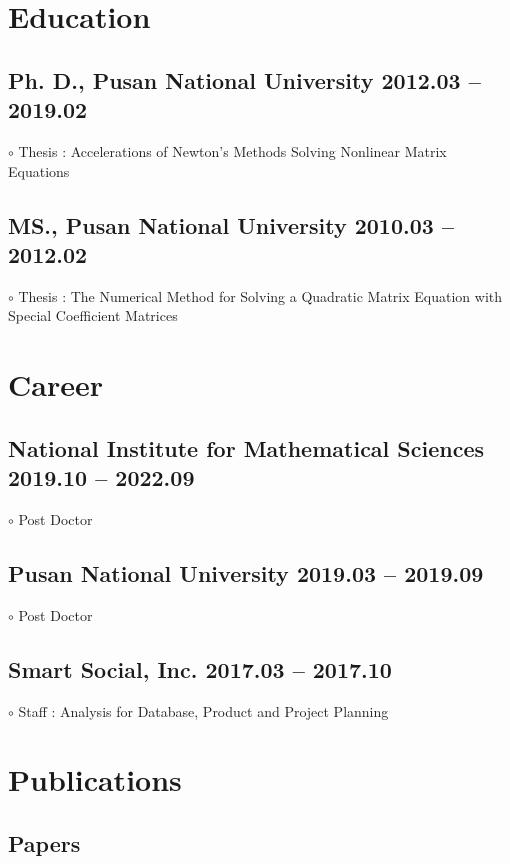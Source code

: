 \documentclass[11pt]{article} %
\newcommand\myedueng{
	\subsection*{Ph. D., Pusan National University \hfill 2012.03 -- 2019.02} %
	$\circ$ Thesis : Accelerations of Newton's Methods Solving Nonlinear Matrix Equations
	
	\subsection*{MS., Pusan National University \hfill 2010.03 -- 2012.02} %
	$\circ$ Thesis : The Numerical Method for Solving a Quadratic Matrix Equation with Special Coefficient Matrices
}
\newcommand\mycareereng{
	\subsection*{National Institute for Mathematical Sciences \hfill 2019.10 -- 2022.09}
	$\circ$ Post Doctor
	\subsection*{Pusan National University \hfill 2019.03 -- 2019.09}
	$\circ$ Post Doctor
	\subsection*{Smart Social, Inc. \hfill 2017.03 -- 2017.10}
	$\circ$ Staff : Analysis for Database, Product and Project Planning
}
\begin{document}
%


\section*{Education}

\myedueng


%


\section*{Career}
\mycareereng

\section*{Publications}

\subsection*{Papers}
\end{document}
